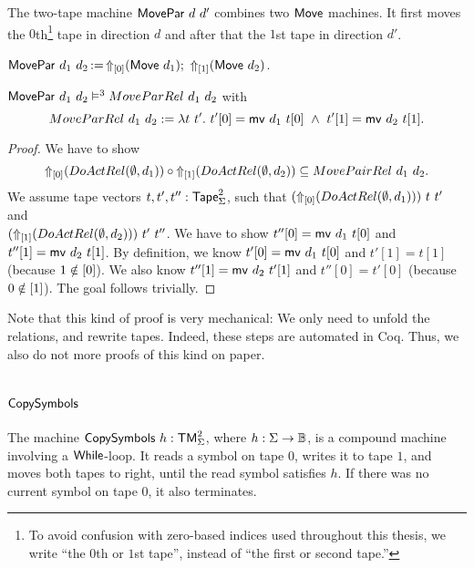 The two-tape machine $\MS{MovePar}~d~d'$ combines two $\MS{Move}$ machines.  It first moves the $0$th\footnote{To avoid confusion with zero-based
  indices used throughout this thesis, we write ``the $0$th or $1$st tape'', instead of ``the first or second tape.''} tape in direction $d$ and after
that the $1$st tape in direction $d'$.
\begin{definition}[$\MS{MovePar}$]
  \label{def:MovePar}
  $\MS{MovePar}~d_1~d_2 \defop \LiftTapes{(\MS{Move}~d_1)}{\Vector{0}} \Seq \LiftTapes{(\MS{Move}~d_2)}{\Vector{1}}$.
\end{definition}
\begin{lemma}
  \label{lem:MovePar_Sem}
  $\MS{MovePar}~d_1~d_2 \RealiseIn3 MoveParRel~d_1~d_2$ with
  \[ MoveParRel~d_1~d_2 := \lambda t~t'.~t'[0]=\MS{mv}~d_1~t[0] ~\land~ t'[1]=\MS{mv}~d_2~t[1]. \]
\end{lemma}
\begin{proof}
  We have to show
  $$
    \LiftTapes{(DoActRel(\None,d_1))}{\Vector{0}} \circ
    \LiftTapes{(DoActRel(\None,d_2))}{\Vector{1}} \subseteq
    MovePairRel~d_1~d_2.
  $$
  We assume tape vectors $t, t', t'' : \Tape_\Sigma^2$, such that $(\LiftTapes{(DoActRel(\None,d_1))}{\Vector{0}})~t~t'$ and \\
  $(\LiftTapes{(DoActRel(\None,d_2))}{\Vector{1}})~t'~t''$.  We have to show $t''[0]=\MS{mv}~d_1~t[0]$ and $t''[1]=\MS{mv}~d_2~t[1]$.  By definition,
  we know $t'[0]=\MS{mv}~d_1~t[0]$ and $t'[1]=t[1]$ (because $1 \notin \Vector{0}$).  We also know $t''[1]=\MS{mv}~d_2~t'[1]$ and $t''[0]=t'[0]$
  (because $0 \notin \Vector{1}$).  The goal follows trivially.
\end{proof}
Note that this kind of proof is very mechanical: We only need to unfold the relations, and rewrite tapes.  Indeed, these steps are automated in Coq.
Thus, we also do not more proofs of this kind on paper.

\section{$\MS{CopySymbols}$}
\label{sec:CopySymbols}

The machine $\MS{CopySymbols}~h : \TM_\Sigma^2$, where $h:\Sigma\to\Bool$, is a compound machine involving a $\While$-loop.  It reads a symbol on tape
$0$, writes it to tape $1$, and moves both tapes to right, until the read symbol satisfies $h$.  If there was no current symbol on tape $0$, it also
terminates.

